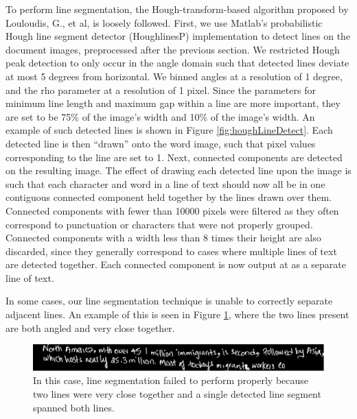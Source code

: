 \documentclass[paper=a4, fontsize=11pt]{scrartcl} %
\numberwithin{equation}{section} %
\numberwithin{figure}{section} %
\numberwithin{table}{section} %
\begin{document}
To perform line segmentation, the Hough-transform-based algorithm
proposed by Louloudis, G., et al, \cite{BlockBased} is loosely
followed. First, we use Matlab's probabilistic Hough line segment
detector (HoughlinesP) implementation to detect lines on the document
images, preprocessed after the previous section. We restricted Hough
peak detection to only occur in the angle domain such that detected
lines deviate at most 5 degrees from horizontal. We binned angles at a
resolution of 1 degree, and the rho parameter at a resolution of 1
pixel. Since the parameters for minimum line length and maximum gap
within a line are more important, they are set to be 75\% of the
image's width and 10\% of the image's width. An example of such
detected lines is shown in Figure \ref{fig:houghLineDetect}. Each
detected line is then ``drawn'' onto the word image, such that pixel
values corresponding to the line are set to 1. Next, connected
components are detected on the resulting image. The effect of drawing
each detected line upon the image is such that each character and word
in a line of text should now all be in one contiguous connected
component held together by the lines drawn over them. Connected
components with fewer than 10000 pixels were filtered as they often
correspond to punctuation or characters that were not properly
grouped. Connected components with a width less than 8 times their
height are also discarded, since they generally correspond to cases
where multiple lines of text are detected together. Each connected
component is now output at as a separate line of text.

In some cases, our line segmentation technique is unable to correctly
separate adjacent lines. An example of this is seen in Figure
\ref{fig:linefail}, where the two lines present are both angled and
very close together.

\begin{figure}
  \centering \includegraphics{linefail.png}
  \caption{In this case, line segmentation failed to perform properly
    because two lines were very close together and a single detected
    line segment spanned both lines.}
  \label{fig:linefail}
\end{figure}
\end{document}
